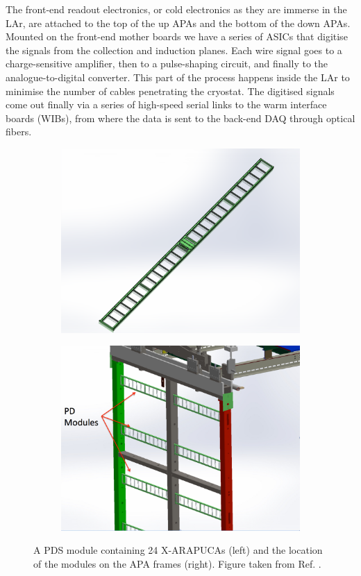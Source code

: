 The front-end readout electronics, or cold electronics as they are immerse in the LAr, are attached to the top of the up APAs and the bottom of the down APAs. Mounted on the front-end mother boards we have a series of ASICs that digitise the signals from the collection and induction planes. Each wire signal goes to a charge-sensitive amplifier, then to a pulse-shaping circuit, and finally to the analogue-to-digital converter. This part of the process happens inside the LAr to minimise the number of cables penetrating the cryostat. The digitised signals come out finally via a series of high-speed serial links to the warm interface boards (WIBs), from where the data is sent to the back-end DAQ through optical fibers.

\begin{figure}[t]
	\begin{subfigure}{0.49\textwidth}
		\centering
		\includegraphics[width=.90\linewidth]{Images/DUNE/FD/pds-module}
	\end{subfigure}
	\begin{subfigure}{0.49\textwidth}
		\centering
		\includegraphics[width=.90\linewidth]{Images/DUNE/FD/pds-in-apa-assembly}
	\end{subfigure}
	\caption[A PDS module containing 24 X-ARAPUCAs and the location of the modules on the APA frames.]{A PDS module containing 24 X-ARAPUCAs (left) and the location of the modules on the APA frames (right). Figure taken from Ref. \cite{DUNE2020TDR1}.}
	\label{fig:dune_pds}
\end{figure}

